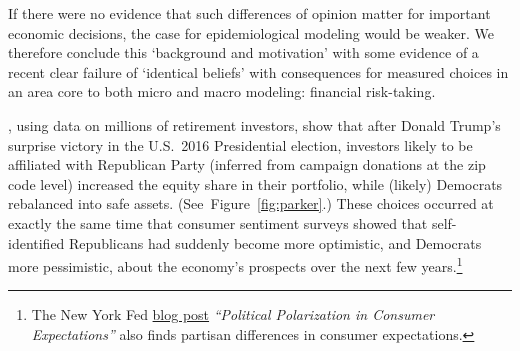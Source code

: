 If there were no evidence that such differences of opinion matter for important economic decisions, the case for epidemiological modeling would be weaker.  We therefore conclude this `background and motivation' with some evidence of a recent clear failure of `identical beliefs' with consequences for measured choices in an area core to both micro and macro modeling: financial risk-taking.

, using data on millions of retirement investors, show that after Donald Trump's surprise victory in the U.S.\ 2016 Presidential election, investors likely to be affiliated with Republican Party (inferred from  campaign donations at the zip code level) increased the equity share in their portfolio, while (likely) Democrats rebalanced into safe assets. (See~Figure~\ref{fig:parker}.)  These choices occurred at exactly the same time that consumer sentiment surveys showed that self-identified Republicans had suddenly become more optimistic, and Democrats more pessimistic, about the economy's prospects over the next few years.\footnote{The New York Fed \href{https://libertystreeteconomics.newyorkfed.org/2017/12/political-polarization-in-consumer-expectation'}{blog post} \textit{``Political Polarization in Consumer Expectations''} also finds partisan differences in consumer expectations.}




